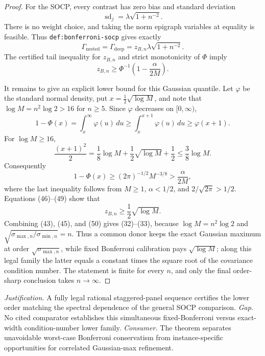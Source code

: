 \documentclass{article}
\begin{document}
\begin{proof}
For the SOCP, every contrast has zero bias and standard deviation
\[
 \operatorname{sd}_j=\lambda\sqrt{1+n^{-2}}. \tag{44}
\]
There is no weight choice, and taking the norm epigraph variables at equality
is feasible.  Thus \texttt{def:bonferroni-socp} gives exactly
\[
 \Gamma_{\mathrm{nested}}=\Gamma_{\mathrm{deep}}
 =z_{B,n}\lambda\sqrt{1+n^{-2}}. \tag{45}
\]
The certified tail inequality for \(z_{B,n}\) and strict monotonicity of
\(\Phi\) imply
\[
 z_{B,n}\geq\Phi^{-1}\!\left(1-\frac{\alpha}{2M}\right). \tag{46}
\]

It remains to give an explicit lower bound for this Gaussian quantile.  Let
\(\varphi\) be the standard normal density, put
\(x=\tfrac12\sqrt{\log M}\), and note that
\(\log M=n^2\log2>16\) for \(n\geq5\).  Since \(\varphi\) decreases on
\([0,\infty)\),
\[
 1-\Phi(x)=\int_x^\infty\varphi(u)\,du
 \geq\int_x^{x+1}\varphi(u)\,du
 \geq\varphi(x+1). \tag{47}
\]
For \(\log M\geq16\),
\[
 \frac{(x+1)^2}{2}
 =\frac18\log M+\frac12\sqrt{\log M}+\frac12
 \leq\frac38\log M. \tag{48}
\]
Consequently
\[
 1-\Phi(x)
 \geq(2\pi)^{-1/2}M^{-3/8}
 >\frac{\alpha}{2M}, \tag{49}
\]
where the last inequality follows from \(M\geq1\), \(\alpha<1/2\), and
\(2/\sqrt{2\pi}>1/2\).  Equations (46)--(49) show that
\[
 z_{B,n}\geq\frac12\sqrt{\log M}. \tag{50}
\]
Combining (43), (45), and (50) gives (32)--(33), because
\(\log M=n^2\log2\) and
\(\sqrt{\sigma_{\max,n}/\sigma_{\min,n}}=n\).  Thus a common donor keeps the
exact Gaussian maximum at order \(\sqrt{\sigma_{\max,n}}\), while fixed
Bonferroni calibration pays \(\sqrt{\log M}\); along this legal family the
latter equals a constant times the square root of the covariance condition
number.  The statement is finite for every \(n\), and only the final
order-sharp conclusion takes \(n\to\infty\).
\end{proof}
\par\smallskip\noindent \textit{Justification.} A fully legal rational staggered-panel sequence certifies the lower order matching the spectral dependence of the general SOCP comparison. \textit{Gap.} No cited comparator establishes this simultaneous fixed-Bonferroni versus exact-width condition-number lower family. \textit{Consumer.} The theorem separates unavoidable worst-case Bonferroni conservatism from instance-specific opportunities for correlated Gaussian-max refinement.
\end{document}
